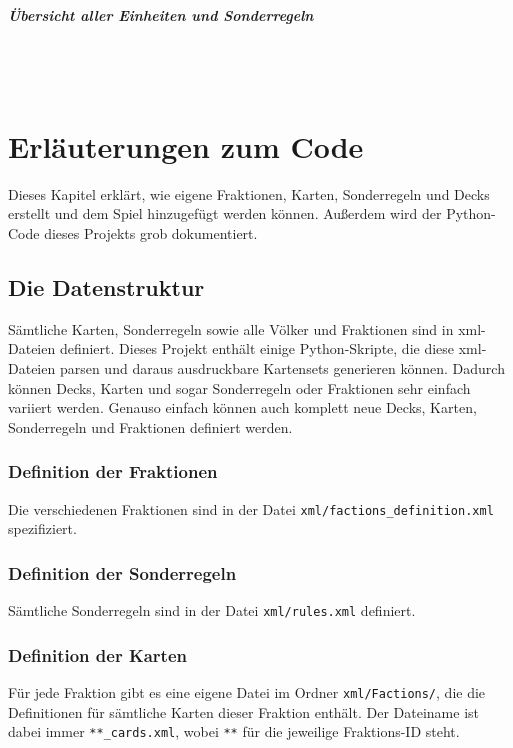 \documentclass[a4paper,11pt]{report}
\begin{document}
\paragraph{Übersicht aller Einheiten und Sonderregeln}~\\
\\


\chapter{Erläuterungen zum Code}
Dieses Kapitel erklärt, wie eigene Fraktionen, Karten, Sonderregeln und Decks erstellt und dem Spiel hinzugefügt werden können. Außerdem wird der Python-Code dieses Projekts grob dokumentiert.

\section{Die Datenstruktur}
Sämtliche Karten, Sonderregeln sowie alle Völker und Fraktionen sind in xml-Dateien definiert. Dieses Projekt enthält einige Python-Skripte, die diese xml-Dateien parsen und daraus ausdruckbare Kartensets generieren können. Dadurch können Decks, Karten und sogar Sonderregeln oder Fraktionen sehr einfach variiert werden. Genauso einfach können auch komplett neue Decks, Karten, Sonderregeln und Fraktionen definiert werden.

\subsection{Definition der Fraktionen}
Die verschiedenen Fraktionen sind in der Datei \verb+xml/factions_definition.xml+ spezifiziert.

\subsection{Definition der Sonderregeln}
Sämtliche Sonderregeln sind in der Datei \verb+xml/rules.xml+ definiert.

\subsection{Definition der Karten}
Für jede Fraktion gibt es eine eigene Datei im Ordner \verb+xml/Factions/+, die die Definitionen für sämtliche Karten dieser Fraktion enthält. Der Dateiname ist dabei immer \verb+**_cards.xml+, wobei \verb+**+ für die jeweilige Fraktions-ID steht.
\end{document}

